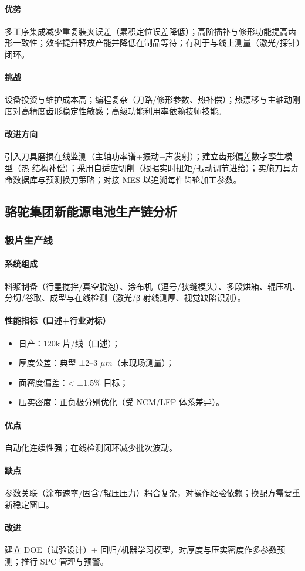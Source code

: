 \paragraph{优势} 多工序集成减少重复装夹误差（累积定位误差降低）；高阶插补与修形功能提高齿形一致性；效率提升释放产能并降低在制品等待；有利于与线上测量（激光/探针）闭环。
\paragraph{挑战} 设备投资与维护成本高；编程复杂（刀路/修形参数、热补偿）；热漂移与主轴动刚度对高精度齿形稳定性敏感；高级功能利用率依赖技师技能。
\paragraph{改进方向} 引入刀具磨损在线监测（主轴功率谱+振动+声发射）；建立齿形偏差数字孪生模型（热-结构补偿）；采用自适应切削（根据实时扭矩/振动调节进给）；实施刀具寿命数据库与预测换刀策略；对接 MES 以追溯每件齿轮加工参数。

\subsection{骆驼集团新能源电池生产链分析}

\subsubsection{极片生产线}
\paragraph{系统组成} 料浆制备（行星搅拌/真空脱泡）、涂布机（逗号/狭缝模头）、多段烘箱、辊压机、分切/卷取、成型与在线检测（激光/β 射线测厚、视觉缺陷识别）。\paragraph{性能指标（口述+行业对标）}\begin{itemize}\item 日产：120k 片/线（口述）；\item 厚度公差：典型 ±2--3 \(\mu m\)（未现场测量）；\item 面密度偏差：< ±1.5\% 目标；\item 压实密度：正负极分别优化（受 NCM/LFP 体系差异）。\end{itemize} \paragraph{优点} 自动化连续性强；在线检测闭环减少批次波动。\paragraph{缺点} 参数关联（涂布速率/固含/辊压压力）耦合复杂，对操作经验依赖；换配方需要重新稳定窗口。\paragraph{改进} 建立 DOE（试验设计）+ 回归/机器学习模型，对厚度与压实密度作多参数预测；推行 SPC 管理与预警。

